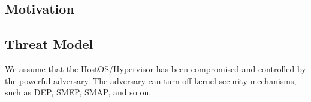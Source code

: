 \subsection{Motivation} \label{sub:motivation}

\subsection{Threat Model} \label{sub:thretmodel}
We assume that the HostOS/Hypervisor has been compromised and controlled by the powerful adversary. The adversary can turn off kernel security mechanisms, such as DEP, SMEP, SMAP, and so on. 


